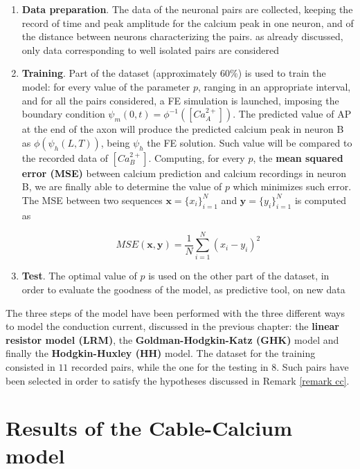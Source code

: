 \documentclass[12pt, a4paper]{report}
\begin{document}
\begin{enumerate}
	\item \textbf{Data preparation}. The data of the neuronal pairs are collected, keeping the record of time and peak amplitude for the calcium peak in one neuron, and of the distance between neurons characterizing the pairs. as already discussed, only data corresponding to well isolated pairs are considered
	
	\item \textbf{Training}. Part of the dataset (approximately $ 60 \%$) is used to train the model: for every value of the parameter $p$, ranging in an appropriate  interval, and for all the pairs considered, a  FE simulation is launched, imposing the boundary condition  $\psi_m(0,t) = \phi^{-1}([Ca^{2+}_A])$. The predicted value of AP at the end of the axon will produce the predicted calcium peak in neuron B as $\phi(\psi_h(L,T))$, being $\psi_h$ the FE solution. Such value will be compared to the recorded data of $[Ca^{2+}_B]$. Computing, for every $p$, the \textbf{mean squared error (MSE)} between calcium prediction and calcium recordings in neuron B, we are finally able to determine the value of $p$ which minimizes such error. The MSE between two sequences $\textbf{x} = \{x_i\}_{i=1}^N$ and $\textbf{y} = \{y_i\}_{i=1}^N$ is computed as
	
	\begin{equation}
	MSE(\textbf{x},\textbf{y}) = \frac{1}{N}\sum_{i=1}^{N}(x_i-y_i)^2
	\end{equation}
	
	\item \textbf{Test}. The optimal value of $p$ is used on the other part of the dataset, in order to evaluate the goodness of the model, as predictive tool, on new data
	
\end{enumerate}




The three steps of the model have been performed with the three different ways to model the conduction current, discussed in the previous chapter:  the \textbf{linear resistor model (LRM)}, the \textbf{Goldman-Hodgkin-Katz (GHK)} model and finally the \textbf{Hodgkin-Huxley (HH)} model. The dataset for the training consisted in $11$ recorded pairs, while the one for the testing in $8$. Such pairs have been selected in order to satisfy the hypotheses discussed in Remark \ref{remark cc}.

\section{Results of the Cable-Calcium model}
\end{document}
